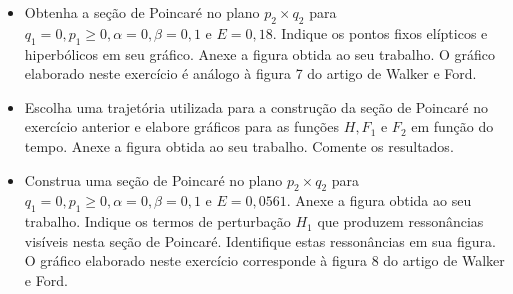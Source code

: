 \documentclass[a4paper]{article}
\begin{document}
\begin{center}
\begin{itemize}
    \item[(2.6)] Obtenha a seção de Poincaré no plano \( p_2 \times q_2 \) para \( q_1 = 0, p_1 \geq 0, \alpha = 0, \beta = 0,1 \) e \( E = 0,18 \). Indique os pontos fixos elípticos e hiperbólicos em seu gráfico. Anexe a figura obtida ao seu trabalho. O gráfico elaborado neste exercício é análogo à figura 7 do artigo de Walker e Ford.
    \begin{answer}[Ítem 2.6]
    \end{answer}

    \item[(2.7)] Escolha uma trajetória utilizada para a construção da seção de Poincaré no exercício anterior e elabore gráficos para as funções \( H, F_1 \) e \( F_2 \) em função do tempo. Anexe a figura obtida ao seu trabalho. Comente os resultados.
    \begin{answer}[Ítem 2.7]
    \end{answer}

    \item[(2.8)] Construa uma seção de Poincaré no plano \( p_2 \times q_2 \) para \( q_1 = 0, p_1 \geq 0, \alpha = 0, \beta = 0,1 \) e \( E = 0,0561 \). Anexe a figura obtida ao seu trabalho. Indique os termos de perturbação \( H_1 \) que produzem ressonâncias visíveis nesta seção de Poincaré. Identifique estas ressonâncias em sua figura. O gráfico elaborado neste exercício corresponde à figura 8 do artigo de Walker e Ford.
    \begin{answer}[Ítem 2.8]
    \end{answer}


\end{itemize}
\end{center}
\end{document}
